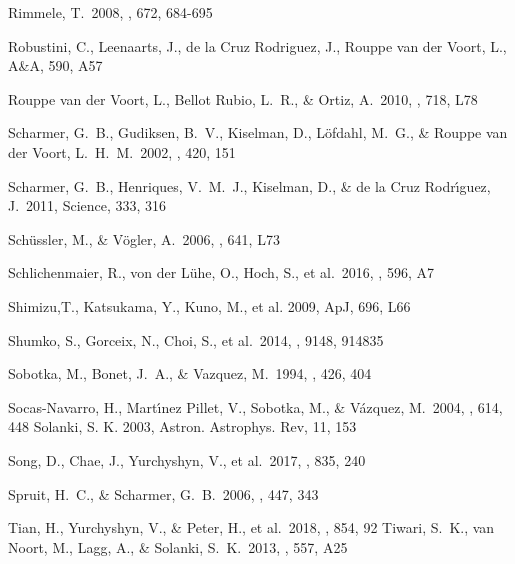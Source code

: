 \documentclass[preprint2]{aastex}
\begin{document}
\begin{thebibliography}{}
Rimmele, T.\ 2008, \apj, 672, 684-695

Robustini, C., Leenaarts, J., de la Cruz Rodriguez, J., Rouppe van der Voort, L., A\&A, 590, A57

Rouppe van der Voort, L., Bellot Rubio, L.~R., \& Ortiz, A.\ 2010, \apjl, 718, L78

Scharmer, G.~B., Gudiksen, B.~V., Kiselman, D., L{\"o}fdahl, M.~G., \& Rouppe van der Voort, L.~H.~M.\ 2002, \nat, 420, 151

Scharmer, G.~B., Henriques, V.~M.~J., Kiselman, D., \& de la Cruz Rodr{\'{\i}}guez, J.\ 2011, Science, 333, 316 


Sch{\"u}ssler, M., \& V{\"o}gler, A.\ 2006, \apjl, 641, L73


 Schlichenmaier, R., von der L{\"u}he, O., Hoch, S., et al.\ 2016, \aap, 596, A7

Shimizu,T., Katsukama, Y., Kuno, M., et al. 2009, ApJ, 696, L66
%

Shumko, S., Gorceix, N., Choi, S., et al.\ 2014, \procspie, 9148, 914835

 Sobotka, M., Bonet, J.~A., \& Vazquez, M.\ 1994, \apj, 426, 404

 Socas-Navarro, H., Mart{\'{\i}}nez Pillet, V., Sobotka, M., \& V{\'a}zquez, M.\ 2004, \apj, 614, 448
Solanki, S. K. 2003, Astron. Astrophys. Rev, 11, 153

 Song, D., Chae, J., Yurchyshyn, V., et al.\ 2017, \apj, 835, 240

Spruit, H.~C., \& Scharmer, G.~B.\ 2006, \aap, 447, 343

Tian, H., Yurchyshyn, V., \& Peter, H., et al.\ 2018, \apj, 854, 92
 Tiwari, S.~K., van Noort, M., Lagg, A., \& Solanki, S.~K.\ 2013, \aap, 557, A25


\end{thebibliography}
\end{document}
